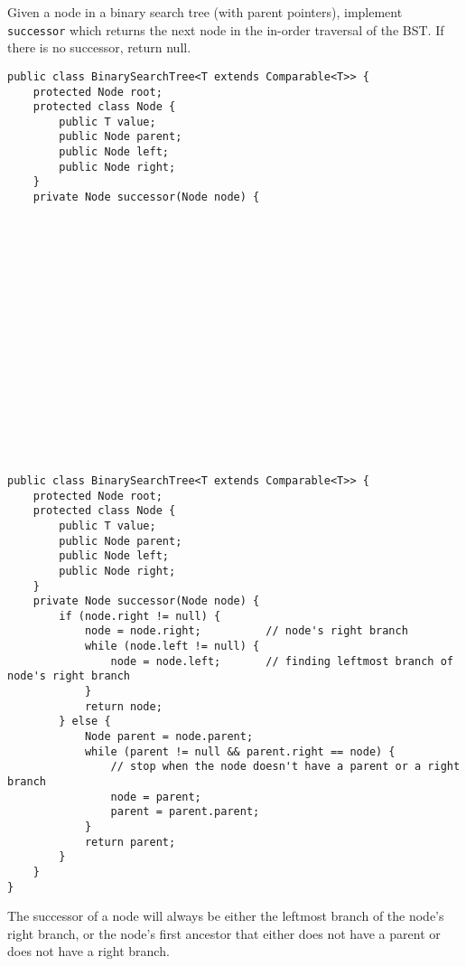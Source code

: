\begin{blocksection}
\question Given a node in a binary search tree (with parent pointers),
implement \lstinline$successor$ which returns the next node in the in-order
traversal of the BST. If there is no successor, return null.

\ifprintanswers
\else
\begin{lstlisting}
public class BinarySearchTree<T extends Comparable<T>> {
    protected Node root;
    protected class Node {
        public T value;
        public Node parent;
        public Node left;
        public Node right;
    }
    private Node successor(Node node) {


















\end{lstlisting}
\fi

\begin{solution}[2.5in]
\begin{lstlisting}
public class BinarySearchTree<T extends Comparable<T>> {
    protected Node root;
    protected class Node {
        public T value;
        public Node parent;
        public Node left;
        public Node right;
    }
    private Node successor(Node node) {
        if (node.right != null) {
            node = node.right;          // node's right branch
            while (node.left != null) {
                node = node.left;       // finding leftmost branch of node's right branch
            }
            return node;
        } else {
            Node parent = node.parent;
            while (parent != null && parent.right == node) {
                // stop when the node doesn't have a parent or a right branch
                node = parent;
                parent = parent.parent;
            }
            return parent;
        }
    }
}
\end{lstlisting}

The successor of a node will always be either the leftmost branch of the node's
right branch, or the node's first ancestor that either does not have a parent
or does not have a right branch.
\end{solution}
\end{blocksection}
